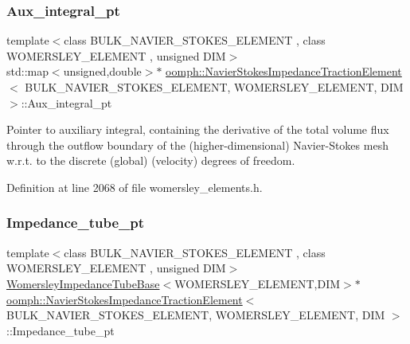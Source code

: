 \subsubsection{\texorpdfstring{Aux\+\_\+integral\+\_\+pt}{Aux\_integral\_pt}}
{\footnotesize\ttfamily template$<$class B\+U\+L\+K\+\_\+\+N\+A\+V\+I\+E\+R\+\_\+\+S\+T\+O\+K\+E\+S\+\_\+\+E\+L\+E\+M\+E\+NT , class W\+O\+M\+E\+R\+S\+L\+E\+Y\+\_\+\+E\+L\+E\+M\+E\+NT , unsigned D\+IM$>$ \\
std\+::map$<$unsigned,double$>$$\ast$ \hyperlink{classoomph_1_1NavierStokesImpedanceTractionElement}{oomph\+::\+Navier\+Stokes\+Impedance\+Traction\+Element}$<$ B\+U\+L\+K\+\_\+\+N\+A\+V\+I\+E\+R\+\_\+\+S\+T\+O\+K\+E\+S\+\_\+\+E\+L\+E\+M\+E\+NT, W\+O\+M\+E\+R\+S\+L\+E\+Y\+\_\+\+E\+L\+E\+M\+E\+NT, D\+IM $>$\+::Aux\+\_\+integral\+\_\+pt\hspace{0.3cm}{\ttfamily [private]}}



Pointer to auxiliary integral, containing the derivative of the total volume flux through the outflow boundary of the (higher-\/dimensional) Navier-\/\+Stokes mesh w.\+r.\+t. to the discrete (global) (velocity) degrees of freedom. 



Definition at line 2068 of file womersley\+\_\+elements.\+h.

\mbox{\label{classoomph_1_1NavierStokesImpedanceTractionElement_a65123707e91f7a351bb9cffb64e1b81c}} 
\subsubsection{\texorpdfstring{Impedance\+\_\+tube\+\_\+pt}{Impedance\_tube\_pt}}
{\footnotesize\ttfamily template$<$class B\+U\+L\+K\+\_\+\+N\+A\+V\+I\+E\+R\+\_\+\+S\+T\+O\+K\+E\+S\+\_\+\+E\+L\+E\+M\+E\+NT , class W\+O\+M\+E\+R\+S\+L\+E\+Y\+\_\+\+E\+L\+E\+M\+E\+NT , unsigned D\+IM$>$ \\
\hyperlink{classoomph_1_1WomersleyImpedanceTubeBase}{Womersley\+Impedance\+Tube\+Base}$<$W\+O\+M\+E\+R\+S\+L\+E\+Y\+\_\+\+E\+L\+E\+M\+E\+NT,D\+IM$>$$\ast$ \hyperlink{classoomph_1_1NavierStokesImpedanceTractionElement}{oomph\+::\+Navier\+Stokes\+Impedance\+Traction\+Element}$<$ B\+U\+L\+K\+\_\+\+N\+A\+V\+I\+E\+R\+\_\+\+S\+T\+O\+K\+E\+S\+\_\+\+E\+L\+E\+M\+E\+NT, W\+O\+M\+E\+R\+S\+L\+E\+Y\+\_\+\+E\+L\+E\+M\+E\+NT, D\+IM $>$\+::Impedance\+\_\+tube\+\_\+pt\hspace{0.3cm}{\ttfamily [private]}}



